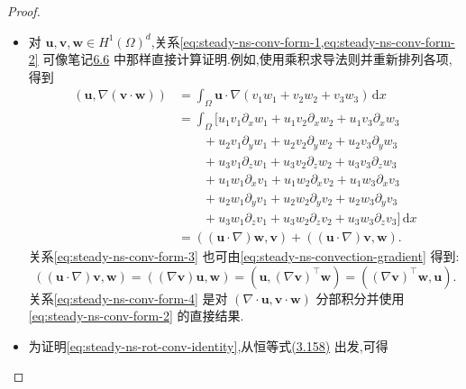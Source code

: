 \begin{proof}
\begin{itemize}
{\begin{align*}
    &\qquad+(a\widetilde u_3+b\widehat u_3)\partial_zv_2\bigr]w_2\\
    &\qquad+\bigl[(a\widetilde u_1+b\widehat u_1)\partial_xv_3
          +(a\widetilde u_2+b\widehat u_2)\partial_yv_3\\
    &\qquad+(a\widetilde u_3+b\widehat u_3)\partial_zv_3\bigr]w_3
       \Bigr\}\,\mathrm{d}x\\
    &\quad=a((\widetilde{\bm{u}}\cdot\nabla)\bm{v},\bm{w})\\
    &\qquad+b((\widehat{\bm{u}}\cdot\nabla)\bm{v},\bm{w}).
  \end{align*}
  }
  对另外两个自变量的证明类似.
  \item 对 $\bm{u},\bm{v},\bm{w}\in H^1(\Omega)^d$,关系\cref{eq:steady-ns-conv-form-1,eq:steady-ns-conv-form-2} 可像笔记\hyperref[note:steady-ns-convection-forms]{6.6} 中那样直接计算证明.例如,使用乘积求导法则并重新排列各项,得到
  \begin{align*}
    (\bm{u},\nabla(\bm{v}\cdot\bm{w}))
      &=\int_\Omega \bm{u}\cdot\nabla
         (v_1w_1+v_2w_2+v_3w_3)\,\mathrm{d}x\\
      &=\int_\Omega\bigl[
        u_1v_1\partial_xw_1+u_1v_2\partial_xw_2+u_1v_3\partial_xw_3\\
      &\qquad+u_2v_1\partial_yw_1+u_2v_2\partial_yw_2+u_2v_3\partial_yw_3\\
      &\qquad+u_3v_1\partial_zw_1+u_3v_2\partial_zw_2+u_3v_3\partial_zw_3\\
      &\qquad+u_1w_1\partial_xv_1+u_1w_2\partial_xv_2+u_1w_3\partial_xv_3\\
      &\qquad+u_2w_1\partial_yv_1+u_2w_2\partial_yv_2+u_2w_3\partial_yv_3\\
      &\qquad+u_3w_1\partial_zv_1+u_3w_2\partial_zv_2+u_3w_3\partial_zv_3\bigr]\,\mathrm{d}x\\
      &=((\bm{u}\cdot\nabla)\bm{w},\bm{v})
        +((\bm{u}\cdot\nabla)\bm{v},\bm{w}).
  \end{align*}
  关系\cref{eq:steady-ns-conv-form-3} 也可由\cref{eq:steady-ns-convection-gradient} 得到:
  \[
    ((\bm{u}\cdot\nabla)\bm{v},\bm{w})
     =((\nabla\bm{v})\bm{u},\bm{w})
     =(\bm{u},(\nabla\bm{v})^{\top}\bm{w})
     =((\nabla\bm{v})^{\top}\bm{w},\bm{u}).
  \]
  关系\cref{eq:steady-ns-conv-form-4} 是对 $(\nabla\cdot\bm{u},\bm{v}\cdot\bm{w})$ 分部积分并使用\cref{eq:steady-ns-conv-form-2} 的直接结果.
  \item 为证明\cref{eq:steady-ns-rot-conv-identity},从恒等式\hyperref[eq:curl-cross-product-identity]{(3.158)} 出发,可得
  \begin{equation}\label{eq:steady-ns-rot-conv-step}

\end{equation}
\end{itemize}
\end{proof}
